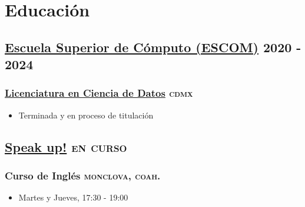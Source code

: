 \documentclass{article}
\newcommand{\rside}[1]{\hfill \normalfont\scshape\MakeLowercase{#1}}
\begin{document}
\noindent 
\begin{minipage}[t]{0.58\textwidth}
  \section{\faGraduationCap\enspace Educación}
  
  \subsection{\href{https://www.escom.ipn.mx/}{Escuela Superior de Cómputo (ESCOM)} \rside{2020 - 2024}}
  \subsubsection{\href{https://www.escom.ipn.mx/htmls/oferta/lcd2020.php}{Licenciatura en Ciencia de Datos} \rside{CDMX}}
  \begin{itemize}
    \item Terminada y en proceso de titulación
  \end{itemize}
  
  \subsection{\href{https://www.facebook.com/speakenglishmva}{Speak up!} \rside{En curso}}
  \subsubsection{Curso de Inglés \rside{Monclova, Coah.}}
  \begin{itemize}
    \item Martes y Jueves, 17:30 - 19:00
  \end{itemize}
\end{minipage}\hfill
\end{document}
